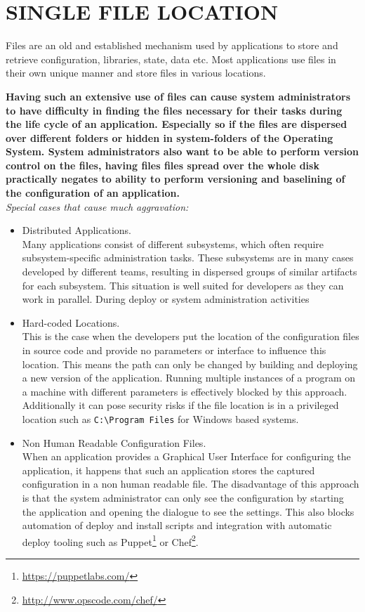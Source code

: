 \newpage
\section*{SINGLE FILE LOCATION}
Files are an old and established mechanism used by applications to store and retrieve configuration, libraries, state, data etc. Most applications use files in their own unique manner and store files in various locations.
\begin{center}
  
\end{center}

\textbf{Having such an extensive use of files can cause system administrators to have difficulty in finding the files necessary for their tasks during the life cycle of an application. Especially so if the files are dispersed over different folders or hidden in system-folders of the Operating System. System administrators also want to be able to perform version control on the files, having files files spread  over the whole disk practically negates to ability to perform versioning and baselining of the configuration of an application.}\\

\textit{Special cases that cause much aggravation:}
\begin{itemize}
\item Distributed Applications.\\
Many applications consist of different subsystems, which often require  subsystem-specific administration tasks. These subsystems are in many cases developed by different teams, resulting in dispersed groups of similar artifacts for each subsystem. This situation is well suited for developers as they can work in parallel. During deploy or system administration activities 
\item Hard-coded Locations.\\
This is the case when the developers put the location of the configuration files in source code and provide no parameters or interface to influence this location. This means the path can only be changed by building and deploying a new version of the application. Running multiple instances of a program on a machine with different parameters is effectively blocked by this approach. Additionally it can pose security risks if the file location is in a privileged location such as \verb|C:\Program Files| for Windows based systems.
\item Non Human Readable Configuration Files.\\
When an application provides a Graphical User Interface for configuring the application, it happens that such an application stores the captured configuration in a non human readable file. The disadvantage of this approach is that the system administrator can only see the configuration by starting the application and opening the dialogue to see the settings. This also blocks automation of deploy and install scripts and integration with automatic deploy tooling such as Puppet\footnote{\url{https://puppetlabs.com/}} or Chef\footnote{\url{http://www.opscode.com/chef/}}.
\end{itemize}

